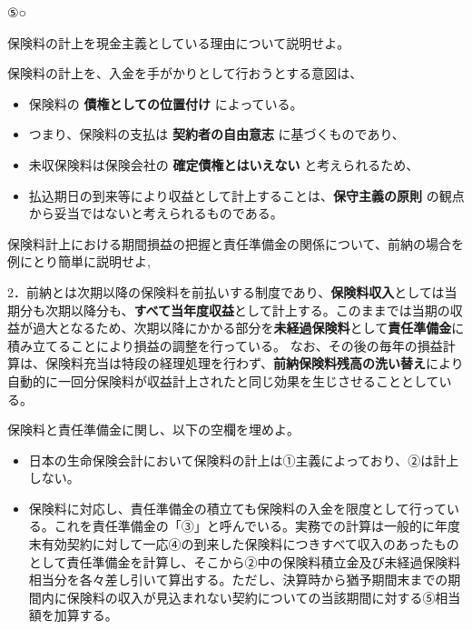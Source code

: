\documentclass[report,gutter=10mm,fore-edge=10mm,uplatex,dvipdfmx]{jlreq}
\begin{document}
⑤○



保険料の計上を現金主義としている理由について説明せよ。


保険料の計上を、入金を手がかりとして行おうとする意図は、

\begin{itemize}
\tightlist
\item
  保険料の \textbf{債権としての位置付け} によっている。
\item
  つまり、保険料の支払は \textbf{契約者の自由意志} に基づくものであり、
\item
  未収保険料は保険会社の \textbf{確定債権とはいえない}
  と考えられるため、
\item
  払込期日の到来等により収益として計上することは、\textbf{保守主義の原則}
  の観点から妥当ではないと考えられるものである。
\end{itemize}



保険料計上における期間損益の把握と責任準備金の関係について、前納の場合を例にとり簡単に説明せよ,



2．前納とは次期以降の保険料を前払いする制度であり、\textbf{保険料収入}としては当期分も次期以降分も、\textbf{すべて当年度収益}として計上する。このままでは当期の収益が過大となるため、次期以降にかかる部分を\textbf{未経過保険料}として\textbf{責任準備金}に積み立てることにより損益の調整を行っている。
なお、その後の毎年の損益計算は、保険料充当は特段の経理処理を行わず、\textbf{前納保険料残高の洗い替え}により自動的に一回分保険料が収益計上されたと同じ効果を生じさせることとしている。


保険料と責任準備金に関し、以下の空欄を埋めよ。

\begin{itemize}
\tightlist
\item
  日本の生命保険会計において保険料の計上は①主義によっており、②は計上しない。
\item
  保険料に対応し、責任準備金の積立ても保険料の入金を限度として行っている。これを責任準備金の「③」と呼んでいる。実務での計算は一般的に年度末有効契約に対して一応④の到来した保険料につきすべて収入のあったものとして責任準備金を計算し、そこから②中の保険料積立金及び未経過保険料相当分を各々差し引いて算出する。ただし、決算時から猶予期間末までの期間内に保険料の収入が見込まれない契約についての当該期間に対する⑤相当額を加算する。
\end{itemize}
\end{document}
